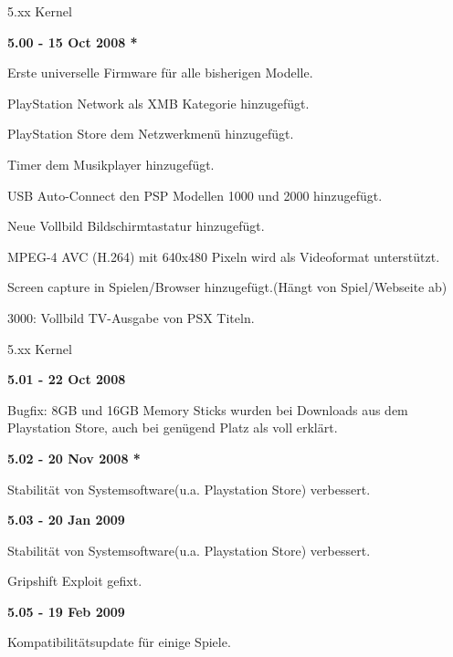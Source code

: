 \documentclass[mode=print,paper=screen,style=jefka]{powerdot}
\begin{document}
\begin{slide}{5.xx Kernel}
	\begin{large}\textbf{5.00 - 15 Oct 2008 *}\end{large}
	\begin{list}{-}{}
		\item{Erste universelle Firmware für alle bisherigen Modelle.}
		\item{PlayStation Network als XMB Kategorie hinzugefügt.}
		\item{PlayStation Store dem Netzwerkmenü hinzugefügt.}
		\item{Timer dem Musikplayer hinzugefügt.}
		\item{USB Auto-Connect den PSP Modellen 1000 und 2000 hinzugefügt.}
		\item{Neue Vollbild Bildschirmtastatur hinzugefügt.}
		\item{MPEG-4 AVC (H.264) mit 640x480 Pixeln wird als Videoformat unterstützt.}
		\item{Screen capture in Spielen/Browser hinzugefügt.(Hängt von Spiel/Webseite ab)} 
		\item{3000: Vollbild TV-Ausgabe von PSX Titeln.}
	\end{list}
\end{slide}

\begin{slide}{5.xx Kernel}
	\begin{large}\textbf{5.01 - 22 Oct 2008}\end{large}
	\begin{list}{-}{}
		\item{Bugfix: 8GB und 16GB Memory Sticks wurden bei Downloads aus dem Playstation Store, auch bei genügend Platz als voll erklärt.}
	\end{list}
	\begin{large}\textbf{5.02 - 20 Nov 2008 *}\end{large}
	\begin{list}{-}{}
		\item{Stabilität von Systemsoftware(u.a. Playstation Store) verbessert.}
	\end{list}
	\begin{large}\textbf{5.03 - 20 Jan 2009}\end{large}
	\begin{list}{-}{}
		\item{Stabilität von Systemsoftware(u.a. Playstation Store) verbessert.}
		\item{Gripshift Exploit gefixt.}
	\end{list}
	\begin{large}\textbf{5.05 - 19 Feb 2009}\end{large}
	\begin{list}{-}{}
		\item{Kompatibilitätsupdate für einige Spiele.}
	\end{list}
\end{slide}
\end{document}
